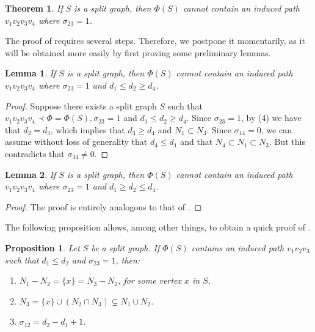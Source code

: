 \documentclass[11pt]{elsarticle}
\newtheorem{theorem}{Theorem}[section]
\newtheorem{lemma}[lemma]{Lemma}
\newtheorem{proposition}[proposition]{Proposition}
\begin{document}
\begin{theorem}
	\label{prohibido.P_4.sigma_23=1}
	If $S$ is a split graph, then $\Phi(S)$ cannot contain an induced path $v_1 v_2 v_3 v_4$ where $\sigma_{23}=1$.
\end{theorem}

The proof of  requires several steps. Therefore, we postpone it momentarily, as it will be obtained more easily by first proving some preliminary lemmas.  

\begin{lemma}
	\label{prohibido.P_4.sigma_23=1.d_1<d_2>d_4}
	If $S$ is a split graph, then $\Phi(S)$ cannot contain an induced path $v_1 v_2 v_3 v_4$ where $\sigma_{23}=1$ and $d_1\leq d_2\geq d_4$.
\end{lemma}

\begin{proof}
	Suppose there exists a split graph $S$ such that $v_1v_2v_3v_4\prec\Phi=\Phi(S), \sigma_{23}=1$ and $d_1\leq d_2\geq d_4$. Since $\sigma_{23}=1$, by (4) we have that $d_2=d_3$, which implies that $d_3\geq d_4$ and $N_1\subset N_3$. Since $\sigma_{14}=0$, we can assume without loss of generality that $d_4\leq d_1$ and that $N_4\subset N_1\subset N_3$. But this contradicts that $\sigma_{34}\neq 0$. 
\end{proof}

\begin{lemma}
	\label{prohibido.P_4.sigma_23=1.d_1>d_2<d_4}
	If $S$ is a split graph, then $\Phi(S)$ cannot contain an induced path $v_1 v_2 v_3 v_4$ where $\sigma_{23}=1$ and $d_1\geq d_2\leq d_4$.
\end{lemma}

\begin{proof}
	The proof is entirely analogous to that of .
\end{proof}

The following proposition allows, among other things, to obtain a quick proof of . 

\begin{proposition}
	\label{P_3.d_1<d_2.sigma_23=1.implica...}
	Let $S$ be a split graph. If $\Phi(S)$ contains an induced path $v_1v_2v_3$ such that $d_1\leq d_2$ and $\sigma_{23}=1$, then:
	\begin{enumerate}
		\item $N_1-N_2=\{x\}=N_3-N_2$, for some vertex $x$ in $S$.
		\item $N_3=\{x\}\dot{\cup}(N_2\cap N_3)\subsetneq N_1\cup N_2$.
		\item $\sigma_{12}=d_2-d_1+1$.
	\end{enumerate} 
\end{proposition}
\end{document}
